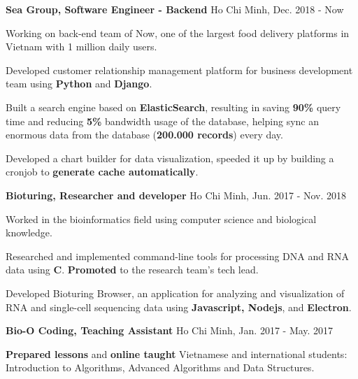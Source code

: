 \begin{cventries} %
  \cvsimpleentry
    {\textbf{Sea Group, Software Engineer - Backend}} %
    {Ho Chi Minh, Dec. 2018 - Now} %
    {
      \begin{cvitems} %
        \item {Working on back-end team of Now, one of the largest food delivery platforms in Vietnam with 1 million daily users.}
        \item {Developed customer relationship management platform for business development team using \textbf{Python} and \textbf{Django}.}
        \item {Built a search engine based on \textbf{ElasticSearch}, resulting in saving \textbf{90\%} query time and reducing \textbf{5\%} bandwidth usage of the database, helping sync an enormous data from the database (\textbf{200.000 records}) every day.}
        \item {Developed a chart builder for data visualization, speeded it up by building a cronjob to \textbf{generate cache automatically}.}
      \end{cvitems}
    }

  \cvsimpleentry
    {\textbf{Bioturing, Researcher and developer}} %
    {Ho Chi Minh, Jun. 2017 - Nov. 2018} %
    {
      \begin{cvitems} %
        \item {Worked in the bioinformatics field using computer science and biological knowledge.}
        \item {Researched and implemented command-line tools for processing DNA and RNA data using \textbf{C}. \textbf{Promoted} to the research team's tech lead.}
        \item {Developed Bioturing Browser, an application for analyzing and visualization of RNA and single-cell sequencing data using \textbf{Javascript, Nodejs}, and \textbf{Electron}.}
      \end{cvitems}
    }

  \cvsimpleentry
    {\textbf{Bio-O Coding, Teaching Assistant}} %
    {Ho Chi Minh, Jan. 2017 - May. 2017} %
    {
      \begin{cvitems} %
        \item {\textbf{Prepared lessons} and \textbf{online taught} Vietnamese and international students: Introduction to Algorithms, Advanced Algorithms and Data Structures.}
      \end{cvitems}
    }

\end{cventries}

